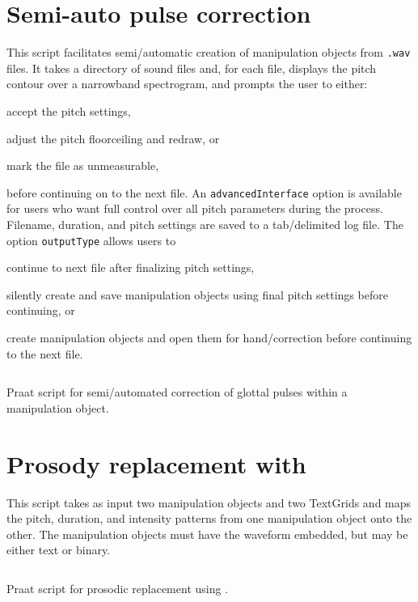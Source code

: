 \section{Semi-auto pulse correction\label{scr:PulseCor}}
This script facilitates semi\-/automatic creation of manipulation objects from \texttt{.wav} files.  It takes a directory of sound files and, for each file, displays the pitch contour over a narrowband spectrogram, and prompts the user to either:
\begin{inparaenum}[(a)]
	\item accept the pitch settings, 
	\item adjust the pitch floor\slsh ceiling and redraw, or
	\item mark the file as unmeasurable,
\end{inparaenum}
before continuing on to the next file.  An \texttt{advancedInterface} option is available for users who want full control over all pitch parameters during the process.  Filename, duration, and pitch settings are saved to a tab\-/delimited log file.  The option \texttt{outputType} allows users to 
\begin{inparaenum}[(a)]
	\item continue to next file after finalizing pitch settings,
	\item silently create and save manipulation objects using final pitch settings before continuing, or
	\item create manipulation objects and open them for hand\-/correction before continuing to the next file.
\end{inparaenum}  
\begin{code}
	\inputminted[fontsize=\footnotesize, tabsize=2]{r}{../scripts/dissversions/SoundToManipulation_DissVersion.praat}
	\caption[Semi-auto pulse correction]{Praat script for semi\-/automated correction of glottal pulses within a manipulation object.\label{lst:PulseCor}}
\end{code}
\newpage

\section{Prosody replacement with \psola\label{scr:Psola}}
This script takes as input two manipulation objects and two {TextGrids} and maps the pitch, duration, and intensity patterns from one manipulation object onto the other.  The manipulation objects must have the waveform embedded, but may be either text or binary.
\begin{code}
	\inputminted[fontsize=\footnotesize, tabsize=2]{r}{../scripts/dissversions/ReplaceProsodyPSOLA_DissVersion.praat}
	\caption[Prosody replacement with \psola]{Praat script for prosodic replacement using \psola.\label{lst:ProsPSOLA}}
\end{code}
\newpage

